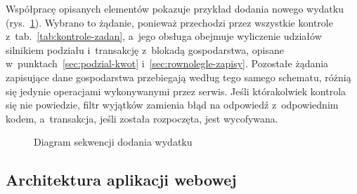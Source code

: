 Współpracę opisanych elementów pokazuje przykład dodania nowego wydatku (rys.~\ref{fig:sekwencja-wydatek}). Wybrano to żądanie, ponieważ przechodzi przez wszystkie kontrole z~tab.~\ref{tab:kontrole-zadan}, a~jego obsługa obejmuje wyliczenie udziałów silnikiem podziału i~transakcję z~blokadą gospodarstwa, opisane w~punktach~\ref{sec:podzial-kwot} i~\ref{sec:rownolegle-zapisy}. Pozostałe żądania zapisujące dane gospodarstwa przebiegają według tego samego schematu, różnią się jedynie operacjami wykonywanymi przez serwis. Jeśli którakolwiek kontrola się nie powiedzie, filtr wyjątków zamienia błąd na odpowiedź z~odpowiednim kodem, a~transakcja, jeśli została rozpoczęta, jest wycofywana.

\begin{figure}[H]
  \centering
  \caption{Diagram sekwencji dodania wydatku}
  \label{fig:sekwencja-wydatek}
\end{figure}

\subsection{Architektura aplikacji webowej}

